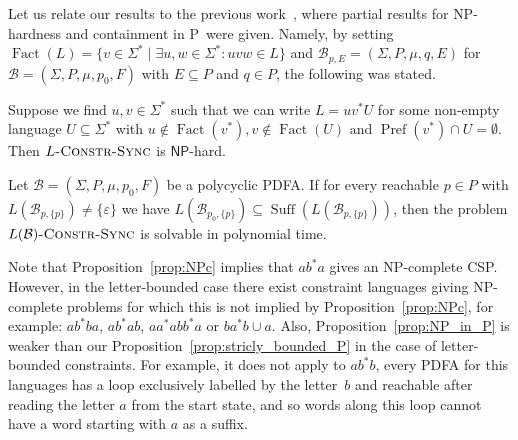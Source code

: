 \documentclass[runningheads,envcountsame]{llncs}
\theoremstyle{plain}
\theoremstyle{definition}
\newcommand{\suff}{\operatorname{Suff}}
\newcommand{\factor}{\operatorname{Fact}}
\newcommand{\pref}{\operatorname{Pref}}
\newcommand{\NP}{\textsf{NP}}
\newcommand{\PTIME}{\textsf{P}}
\begin{document}
%


Let us relate our results to the previous work~\cite{DBLP:conf/ictcs/Hoffmann20}, where
partial results for \NP-hardness and containment in \PTIME\  were given.
Namely, by setting $\factor(L) = \{ v \in \Sigma^* \mid \exists u,w \in \Sigma^* : uvw \in L \}$
and $\mathcal B_{p,E} = (\Sigma, P, \mu, q, E)$
for $\mathcal B = (\Sigma, P, \mu, p_0, F)$ with $E \subseteq P$ and $q \in P$,
the following was stated.

\begin{proposition}
\label{prop:NPc}
 Suppose we find $u, v \in \Sigma^*$ 
 such that we can write
$
 L = u v^* U
$
 for some non-empty language $U \subseteq \Sigma^*$
 with 
 $
  u \notin \factor(v^*), %
  v \notin \factor(U) \mbox{ and } %
  \pref(v^*) \cap U = \emptyset.
 $
 Then $L\textsc{-Constr-Sync}$ is $\NP$-hard.
\end{proposition}

\begin{proposition}
\label{prop:NP_in_P}
  Let $\mathcal{B} = (\Sigma, P, \mu, p_0, F)$ be a polycyclic PDFA.
  If for every reachable $p \in P$ with $L(\mathcal B_{p, \{p\}}) \ne \{\varepsilon\}$ 
  we have $L(\mathcal B_{p_0, \{p\}}) \subseteq \suff(L(\mathcal B_{p, \{p\}}))$,
  then the problem $L(\mathcal B)\textsc{-Constr-Sync}$ is solvable
  in polynomial time.
\end{proposition}

Note that Proposition~\ref{prop:NPc} implies that $ab^*a$
gives an \NP-complete CSP. However, in the letter-bounded
case there exist constraint languages giving \NP-complete problems
for which this is not implied by Proposition~\ref{prop:NPc},
for example: $ab^*ba$, $ab^*ab$, $aa^*abb^*a$ or $ba^*b \cup a$.
Also, Proposition~\ref{prop:NP_in_P}
is weaker than our Proposition~\ref{prop:stricly_bounded_P}
in the case of letter-bounded constraints.
For example, it does not apply to $ab^*b$, every PDFA for this languages
has a loop exclusively labelled by the letter~$b$
and reachable after reading the letter $a$ from the start state, and
so words along this loop cannot have a word starting with $a$ as a suffix.
\end{document}
